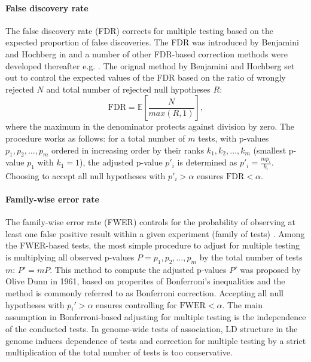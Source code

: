 \paragraph{False discovery rate}
The false discovery rate (FDR) corrects for multiple testing based on the expected proportion of false discoveries. The FDR was introduced by Benjamini and Hochberg in \parencite*{Benjamini1995} and a number of other FDR-based correction methods were developed thereafter e.g. \citep{Storey2002,Donoho2006,Sarkar2007}. The orignal method by Benjamini and Hochberg set out to control the expected values of the FDR based on the ratio of wrongly rejected \(N\) and total number of rejected null hypotheses \(R\):
\begin{equation}
\text{FDR} = \mathbb{E} \left[\frac{N}{max\left(R,1\right)} \right],
\end{equation}
where the maximum in the denominator protects against division by zero. The procedure works as follows: for a total number of \(m\) tests, with p-values \(p_1, p_2, \dots, p_m\) ordered in increasing order by their ranks  \(k_1, k_2, \dots, k_m\) (smallest p-value \(p_1\) with \(k_1=1\)), the adjusted p-value \(p'_i\) is determined as \(p'_i = \frac{mp_i}{k_i}\). Choosing to accept all null hypotheses with \(p'_i > \alpha\) ensures \(\text{FDR} < \alpha\). 

\paragraph{Family-wise error rate}
The family-wise error rate (FWER) controls for the probability of observing at least one false positive result within a given experiment (family of tests) \citep{Shaffer1995}. Among the FWER-based tests, the most simple procedure to adjust for multiple testing is multiplying all observed p-values \(P=p_1, p_2, \dots, p_m\) by the total number of tests \(m\): \(P' = mP\). This method to compute the adjusted p-values \(P'\) was proposed by Olive Dunn in 1961, based on properites of Bonferroni's inequalities \citep{Dunn1961} and the method is commonly referred to as Bonferroni correction. Accepting all null hypotheses with \(p_i' > \alpha\) ensures controlling for \(\text{FWER} < \alpha\). The main assumption in Bonferroni-based adjusting for multiple testing is the independence of the conducted tests. In genome-wide tests of association, LD structure in the genome induces dependence of tests and correction for multiple testing by a strict multiplication of the total number of tests is too conservative. 

